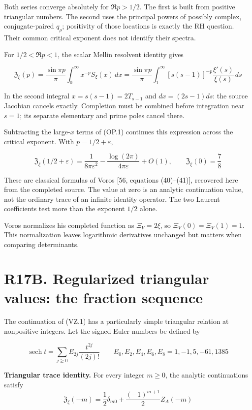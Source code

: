 \documentclass[
  11pt,
]{book}
\renewenvironment{quote}
  {\begin{tcolorbox}[
      enhanced,
      breakable,
      colback=tncream,
      colframe=tnrust,
      boxrule=0.8pt,
      arc=1.5pt,
      left=7pt,
      right=7pt,
      top=6pt,
      bottom=6pt]}
  {\end{tcolorbox}}
\begin{document}
Both series converge absolutely for \(\Re p>1/2\). The first is built
from positive triangular numbers. The second uses the principal powers
of possibly complex, conjugate-paired \(q_\rho\); positivity of those
locations is exactly the RH question. Their common critical exponent
does not identify their spectra.

For \(1/2<\Re p<1\), the scalar Mellin resolvent identity gives

\[
\boxed{\mathfrak Z_\xi(p)
=\frac{\sin\pi p}{\pi}\int_0^\infty x^{-p}S_\xi(x)\,dx
=\frac{\sin\pi p}{\pi}\int_1^\infty
[s(s-1)]^{-p}\frac{\xi'(s)}{\xi(s)}\,ds}
\tag{VZ.2}
\]

In the second integral \(x=s(s-1)=2T_{s-1}\) and \(dx=(2s-1)ds\): the
source Jacobian cancels exactly. Completion must be combined before
integration near \(s=1\); its separate elementary and prime poles cancel
there.

Subtracting the large-\(x\) terms of (OP.1) continues this expression
across the critical exponent. With \(p=1/2+\varepsilon\),

\[
\boxed{\mathfrak Z_\xi(1/2+\varepsilon)
=\frac1{8\pi\varepsilon^2}
-\frac{\log(2\pi)}{4\pi\varepsilon}+O(1),\qquad
\mathfrak Z_\xi(0)=\frac78}
\tag{VZ.3}
\]

These are classical formulas of Voros {[}56, equations (40)--(41){]},
recovered here from the completed source. The value at zero is an
analytic continuation value, not the ordinary trace of an infinite
identity operator. The two Laurent coefficients test more than the
exponent \(1/2\) alone.

Voros normalizes his completed function as \(\Xi_V=2\xi\), so
\(\Xi_V(0)=\Xi_V(1)=1\). This normalization leaves logarithmic
derivatives unchanged but matters when comparing determinants.

\section{R17B. Regularized triangular values: the fraction
sequence}\label{r17b.-regularized-triangular-values-the-fraction-sequence}

The continuation of (VZ.1) has a particularly simple triangular relation
at nonpositive integers. Let the signed Euler numbers be defined by

\[
\operatorname{sech}t=\sum_{j\ge0}E_{2j}\frac{t^{2j}}{(2j)!}
\qquad E_0,E_2,E_4,E_6,E_8=1,-1,5,-61,1385
\tag{TV.1}
\]

\begin{quote}
\textbf{Triangular trace identity.} For every integer \(m\ge0\), the
analytic continuations satisfy \[
\boxed{\mathfrak Z_\xi(-m)
=\frac12\delta_{m0}+\frac{(-1)^{m+1}}2Z_A(-m)}
\tag{TV.2}
\]
\end{quote}
\end{document}

